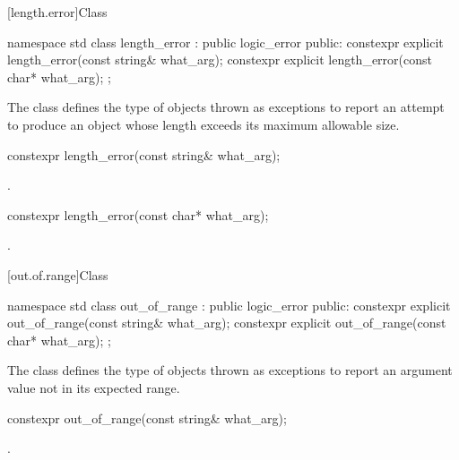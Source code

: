 [length.error]{Class }

%
\begin{codeblock}
namespace std {
  class length_error : public logic_error {
  public:
    constexpr explicit length_error(const string& what_arg);
    constexpr explicit length_error(const char* what_arg);
  };
}
\end{codeblock}

\pnum
The class
defines the type of objects thrown as exceptions
to report an attempt to produce
an object whose length exceeds its maximum allowable size.

%
\begin{itemdecl}
constexpr length_error(const string& what_arg);
\end{itemdecl}

\begin{itemdescr}
\pnum
\ensures
{}.
\end{itemdescr}

%
\begin{itemdecl}
constexpr length_error(const char* what_arg);
\end{itemdecl}

\begin{itemdescr}
\pnum
\ensures
{}.
\end{itemdescr}

[out.of.range]{Class }

%
\begin{codeblock}
namespace std {
  class out_of_range : public logic_error {
  public:
    constexpr explicit out_of_range(const string& what_arg);
    constexpr explicit out_of_range(const char* what_arg);
  };
}
\end{codeblock}

\pnum
The class
defines the type of objects thrown as exceptions to report an
argument value not in its expected range.

%
\begin{itemdecl}
constexpr out_of_range(const string& what_arg);
\end{itemdecl}

\begin{itemdescr}
\pnum
\ensures
{}.
\end{itemdescr}

